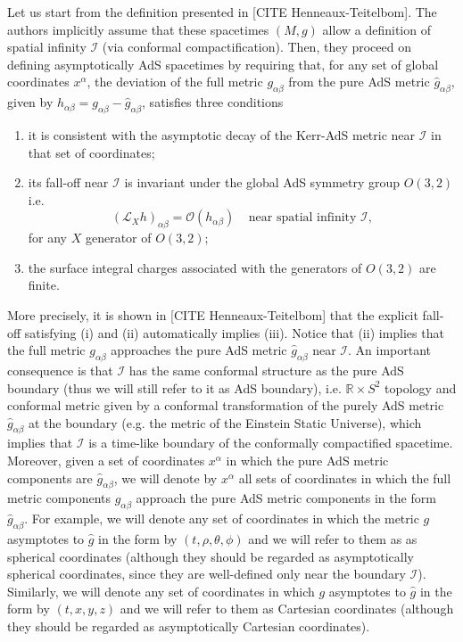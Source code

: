 \documentclass[12pt]{iopart} %
\begin{document}
Let us start from the definition presented in [CITE Henneaux-Teitelbom]. The authors implicitly assume that these spacetimes $(M,g)$ allow a definition of spatial infinity $\mathcal{I}$ (via conformal compactification). Then, they proceed on defining asymptotically AdS spacetimes by requiring that, for any set of global coordinates $x^\alpha$, the deviation of the full metric $g_{\alpha\beta}$ from the pure AdS metric $\hat{g}_{\alpha\beta}$, given by $h_{\alpha\beta}=g_{\alpha\beta}-\hat{g}_{\alpha\beta}$, satisfies three conditions
\begin{enumerate}
\item it is consistent with the asymptotic decay of the Kerr-AdS metric near $\mathcal{I}$ in that set of coordinates;
\item its fall-off near $\mathcal{I}$ is invariant under the global AdS symmetry group $O(3,2)$ i.e.
\begin{equation}\label{eqn:asyKilleq}
(\mathcal{L}_X h)_{\alpha\beta}=\mathcal{O}(h_{\alpha\beta})\;\;\;\; \textrm{near spatial infinity $\mathcal{I}$},
\end{equation}
for any $X$ generator of $O(3,2)$;
\item the surface integral charges associated with the generators of $O(3,2)$ are finite.
\end{enumerate}
More precisely, it is shown in [CITE Henneaux-Teitelbom] that the explicit fall-off satisfying (i) and (ii) automatically implies (iii).
Notice that (ii) implies that the full metric $g_{\alpha\beta}$ approaches the pure AdS metric $\hat{g}_{\alpha\beta}$ near $\mathcal{I}$. An important consequence is that $\mathcal{I}$ has the same conformal structure as the pure AdS boundary (thus we will still refer to it as AdS boundary), i.e. $\mathbb{R}\times S^2$ topology and conformal metric given by a conformal transformation of the purely AdS metric $\hat{g}_{\alpha\beta}$ at the boundary (e.g. the metric of the Einstein Static Universe), which implies that $\mathcal{I}$ is a time-like boundary of the conformally compactified spacetime. Moreover, given a set of coordinates $x^\alpha$ in which the pure AdS metric components are $\hat{g}_{\alpha\beta}$, we will denote by $x^\alpha$ all sets of coordinates in which the full metric components $g_{\alpha\beta}$ approach the pure AdS metric components in the form $\hat{g}_{\alpha\beta}$. For example, we will denote any set of coordinates in which the metric $g$ asymptotes to $\hat{g}$ in the form  by $(t,\rho,\theta,\phi)$ and we will refer to them as as spherical coordinates (although they should be regarded as asymptotically spherical coordinates, since they are well-defined only near the boundary $\mathcal{I}$). Similarly, we will denote any set of coordinates in which $g$ asymptotes to $\hat{g}$ in the form  by $(t,x,y,z)$ and we will refer to them as Cartesian coordinates (although they should be regarded as asymptotically Cartesian coordinates).
\end{document}
